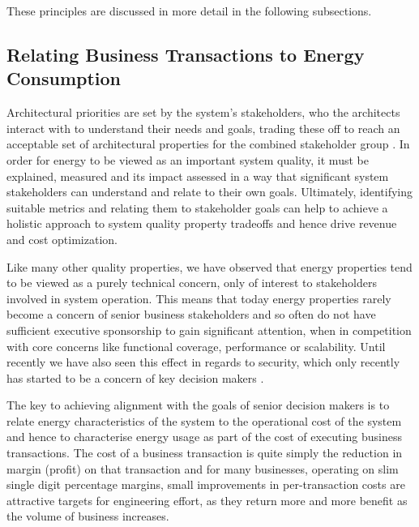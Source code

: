 These principles are discussed in more detail in the following subsections. 

\subsection{Relating Business Transactions to Energy Consumption}

Architectural priorities are set by the system's stakeholders, who the architects interact with to understand their needs and goals, trading these off to reach an acceptable set of architectural properties for the combined stakeholder group \cite{rozanski2011-ssa2e}.  In order for energy to be viewed as an important system quality, it must be explained, measured and its impact assessed in a way that significant system stakeholders can understand and relate to their own goals.  Ultimately, identifying suitable metrics and relating them to stakeholder goals can help to achieve a holistic approach to system quality property tradeoffs and hence drive revenue and cost optimization.

Like many other quality properties, we have observed that energy properties tend to be viewed as a purely technical concern, only of interest to stakeholders involved in system operation.  This means that today energy properties rarely become a concern of senior business stakeholders and so often do not have sufficient executive sponsorship to gain significant attention, when in competition with core concerns like functional coverage, performance or scalability.  Until recently we have also seen this effect in regards to security, which only recently has started to be a concern of key decision makers \cite{cisco2016-uksecprioritisation}.

The key to achieving alignment with the goals of senior decision makers is to relate energy characteristics of the system to the operational cost of the system and hence to characterise energy usage as part of the cost of executing business transactions.  The cost of a business transaction is quite simply the reduction in margin (profit) on that transaction and for many businesses, operating on slim single digit percentage margins, small improvements in per-transaction costs are attractive targets for engineering effort, as they return more and more benefit as the volume of business increases.

